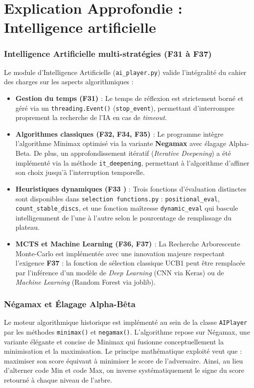 \documentclass[a4paper]{article}
\begin{document}
\section{Explication Approfondie : Intelligence artificielle}

\subsubsection{Intelligence Artificielle multi-stratégies (F31 à F37) \cite{OthelloSpecs2025}}
Le module d'Intelligence Artificielle (\texttt{ai\_player.py}) valide l'intégralité du cahier des charges sur les aspects algorithmiques :
\begin{itemize}
    \item \textbf{Gestion du temps (F31) \cite{OthelloSpecs2025}} : Le temps de réflexion est strictement borné et géré via un \texttt{threading.Event()} (\texttt{stop\_event}), permettant d'interrompre proprement la recherche de l'IA en cas de \textit{timeout}.
    \item \textbf{Algorithmes classiques (F32, F34, F35) \cite{OthelloSpecs2025}} : Le programme intègre l'algorithme Minimax optimisé via la variante \textbf{Negamax} avec élagage Alpha-Beta. De plus, un approfondissement itératif (\textit{Iterative Deepening}) a été implémenté via la méthode \texttt{it\_deepening}, permettant à l'algorithme d'affiner son choix jusqu'à l'interruption temporelle.
    \item \textbf{Heuristiques dynamiques (F33 \cite{OthelloSpecs2025})} : Trois fonctions d'évaluation distinctes sont disponibles dans \texttt{selection functions.py} : \texttt{positional\_eval}, \texttt{count\_stable\_discs}, et une fonction maîtresse \texttt{dynamic\_eval} qui bascule intelligemment de l'une à l'autre selon le pourcentage de remplissage du plateau.
    \item \textbf{MCTS et Machine Learning (F36, F37) \cite{OthelloSpecs2025}} : La Recherche Arborescente Monte-Carlo est implémentée avec une innovation majeure respectant l'exigence \textbf{F37} : la fonction de sélection classique UCB1 peut être remplacée par l'inférence d'un modèle de \textit{Deep Learning} (CNN via Keras) ou de \textit{Machine Learning} (Random Forest via joblib).
\end{itemize}

\subsubsection{Négamax et Élagage Alpha-Bêta}
Le moteur algorithmique historique est implémenté au sein de la classe \texttt{AIPlayer} par les méthodes \texttt{minimax()} et \texttt{negamax()}. L'algorithme repose sur Négamax, une variante élégante et concise de Minimax qui fusionne conceptuellement la minimisation et la maximisation. Le principe mathématique exploité veut que : maximiser son score équivaut à minimiser le score de l'adversaire. Ainsi, au lieu d'alterner code Min et code Max, on inverse systématiquement le signe du score retourné à chaque niveau de l'arbre.
\end{document}
